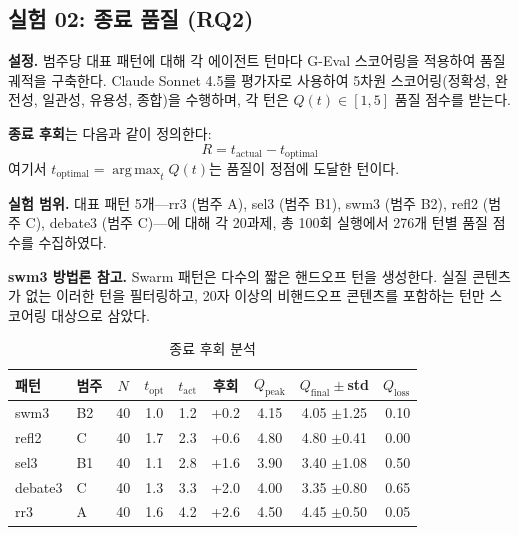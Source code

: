 \documentclass[a4paper,11pt]{article}
\DeclareMathOperator*{\argmax}{arg\,max}
\begin{document}
\subsection{실험 02: 종료 품질 (RQ2)}
\label{sec:exp02}

\textbf{설정.} 범주당 대표 패턴에 대해 각 에이전트 턴마다 G-Eval 스코어링을 적용하여 품질 궤적을 구축한다. Claude Sonnet 4.5를 평가자로 사용하여 5차원 스코어링(정확성, 완전성, 일관성, 유용성, 종합)을 수행하며, 각 턴은 $Q(t) \in [1, 5]$ 품질 점수를 받는다.

\textbf{종료 후회}는 다음과 같이 정의한다:
\begin{equation}
R = t_{\text{actual}} - t_{\text{optimal}}
\end{equation}
여기서 $t_{\text{optimal}} = \argmax_t Q(t)$는 품질이 정점에 도달한 턴이다.

\textbf{실험 범위.} 대표 패턴 5개---rr3 (범주 A), sel3 (범주 B1), swm3 (범주 B2), refl2 (범주 C), debate3 (범주 C)---에 대해 각 20과제, 총 100회 실행에서 276개 턴별 품질 점수를 수집하였다.

\textbf{swm3 방법론 참고.} Swarm 패턴은 다수의 짧은 핸드오프 턴을 생성한다. 실질 콘텐츠가 없는 이러한 턴을 필터링하고, 20자 이상의 비핸드오프 콘텐츠를 포함하는 턴만 스코어링 대상으로 삼았다.

\begin{table}[H]
\centering
\caption{종료 후회 분석}
\label{tab:termination-regret}
{\small
\begin{tabular}{llccccccr}
\toprule
패턴 & 범주 & $N$ & $t_{\text{opt}}$ & $t_{\text{act}}$ & 후회 & $Q_{\text{peak}}$ & $Q_{\text{final}} \pm$std & $Q_{\text{loss}}$ \\
\midrule
swm3    & B2 & 40 & 1.0 & 1.2 & +0.2 & 4.15 & 4.05 $\pm$1.25 & 0.10 \\
refl2   & C  & 40 & 1.7 & 2.3 & +0.6 & 4.80 & 4.80 $\pm$0.41 & 0.00 \\
sel3    & B1 & 40 & 1.1 & 2.8 & +1.6 & 3.90 & 3.40 $\pm$1.08 & 0.50 \\
debate3 & C  & 40 & 1.3 & 3.3 & +2.0 & 4.00 & 3.35 $\pm$0.80 & 0.65 \\
rr3     & A  & 40 & 1.6 & 4.2 & +2.6 & 4.50 & 4.45 $\pm$0.50 & 0.05 \\
\bottomrule
\end{tabular}
}
\end{table}
\end{document}
